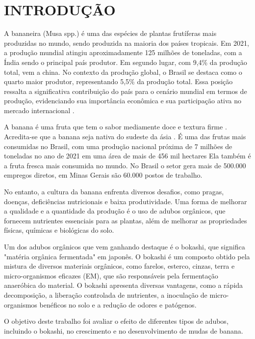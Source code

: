 \chapter{INTRODUÇÃO}

A bananeira (Musa spp.) é uma das espécies de plantas frutíferas mais produzidas no mundo, sendo produzida na maioria dos países tropicais. Em 2021, a produção mundial atingiu aproximadamente 125 milhões de toneladas, com a Índia sendo o principal país produtor. Em segundo lugar, com 9,4\% da produção total, vem a china. No contexto da produção global, o Brasil se destaca como o quarto maior produtor, representando 5,5\% da produção total. Essa posição ressalta a significativa contribuição do país para o cenário mundial em termos de produção, evidenciando sua importância econômica e sua participação ativa no mercado internacional \cite{banana}. 

A banana é uma fruta que tem o sabor mediamente doce e textura firme \cite{MATSUURA2004}. Acredita-se que a banana seja nativa do sudeste da ásia \cite{1956TaOo}. É uma das frutas mais consumidas no Brasil, com uma produção nacional próxima de 7 milhões de toneladas no ano de 2021 em uma área de mais de 456 mil hectares \cite{banana} Ela também é a fruta fresca mais consumida no mundo. No Brasil o setor gera mais de 500.000 empregos diretos, em Minas Gerais são 60.000 postos de trabalho.

No entanto, a cultura da banana enfrenta diversos desafios, como pragas, doenças, deficiências nutricionais e baixa produtividade. Uma forma de melhorar a qualidade e a quantidade da produção é o uso de adubos orgânicos, que fornecem nutrientes essenciais para as plantas, além de melhorar as propriedades físicas, químicas e biológicas do solo.

Um dos adubos orgânicos que vem ganhando destaque é o bokashi, que significa "matéria orgânica fermentada" em japonês. O bokashi é um composto obtido pela mistura de diversos materiais orgânicos, como farelos, esterco, cinzas, terra e micro-organismos eficazes (EM), que são responsáveis pela fermentação anaeróbica do material. O bokashi apresenta diversas vantagens, como a rápida decomposição, a liberação controlada de nutrientes, a inoculação de micro-organismos benéficos no solo e a redução de odores e patógenos.

O objetivo deste trabalho foi avaliar o efeito de diferentes tipos de adubos, incluindo o bokashi, no crescimento e no desenvolvimento de mudas de banana. 

